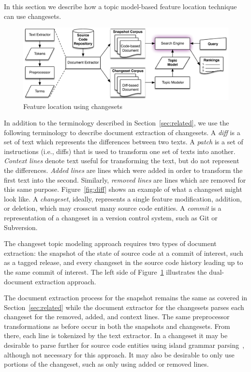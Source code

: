 In this section we describe how a topic model-based feature location
technique can use changesets.

\begin{figure}
\centerline{\includegraphics[width=.75\textwidth]{figures/changeset-flt}}
\caption{Feature location using changesets}
\label{fig:changeset}
\end{figure}

In addition to the terminology described in Section~\ref{sec:related},
we use the following terminology to describe document extraction of changesets.
A \textit{diff} is a set of text which represents the differences between two texts.
A \textit{patch} is a set of instructions (i.e., diffs) that is used to transform one set of texts into another.
\textit{Context lines} denote text useful for transforming the text, but do not represent the differences.
\textit{Added lines} are lines which were added in order to transform the first text into the second.
Similarly, \textit{removed lines} are lines which are removed for this same purpose.
Figure~\ref{fig:diff} shows an example of what a changeset might look like.
A \textit{changeset}, ideally, represents a single feature modification,
addition, or deletion, which may crosscut many source code entities.
A \textit{commit} is a representation of a changeset in a version control system, such as Git or Subversion.

The changeset topic modeling approach requires two types of document extraction:
the snapshot of the state of source code at a commit of interest, such as a tagged release,
and every changeset in the source code history leading up to the same commit of interest.
The left side of Figure~\ref{fig:changeset} illustrates the dual-document extraction approach.

The document extraction process for the snapshot remains the same as covered in Section~\ref{sec:related} while the
document extractor for the changesets parses each changeset for the removed, added, and context lines.
The same preprocessor transformations as before occur in both the snapshots and changesets.
From there, each line is tokenized by the text extractor.
In a changeset it may be desirable to parse further for source code entities using island grammar parsing~\cite{Moonen:2001},
although not necessary for this approach.
It may also be desirable to only use portions of the changeset, such as only using added or removed lines.

